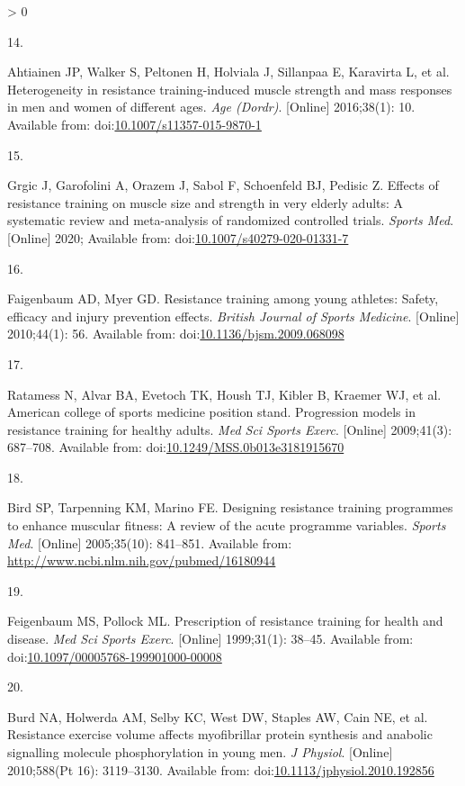 \documentclass[twoside,10pt]{gihclass} %
\newlength{\cslhangindent}
\newlength{\csllabelwidth}
\newenvironment{CSLReferences}[3] %
 {%
  \setlength{\parindent}{0pt}
  \ifodd #1 \everypar{\setlength{\hangindent}{\cslhangindent}}\ignorespaces\fi
  \ifnum #2 > 0
  \setlength{\parskip}{#2\baselineskip}
  \fi
 }%
 {}
\newcommand{\CSLLeftMargin}[1]{\parbox[t]{\maxof{\widthof{#1}}{\csllabelwidth}}{#1}}
\newcommand{\CSLRightInline}[1]{\parbox[t]{\linewidth}{#1}}
\begin{document}
\begin{CSLReferences}{0}{0}
\leavevmode\hypertarget{ref-RN1741}{}%
\CSLLeftMargin{14. }
\CSLRightInline{Ahtiainen JP, Walker S, Peltonen H, Holviala J, Sillanpaa E, Karavirta L, et al. Heterogeneity in resistance training-induced muscle strength and mass responses in men and women of different ages. \emph{Age (Dordr)}. {[}Online{]} 2016;38(1): 10. Available from: doi:\href{https://doi.org/10.1007/s11357-015-9870-1}{10.1007/s11357-015-9870-1}}

\leavevmode\hypertarget{ref-RN2534}{}%
\CSLLeftMargin{15. }
\CSLRightInline{Grgic J, Garofolini A, Orazem J, Sabol F, Schoenfeld BJ, Pedisic Z. Effects of resistance training on muscle size and strength in very elderly adults: A systematic review and meta-analysis of randomized controlled trials. \emph{Sports Med}. {[}Online{]} 2020; Available from: doi:\href{https://doi.org/10.1007/s40279-020-01331-7}{10.1007/s40279-020-01331-7}}

\leavevmode\hypertarget{ref-RN2536}{}%
\CSLLeftMargin{16. }
\CSLRightInline{Faigenbaum AD, Myer GD. Resistance training among young athletes: Safety, efficacy and injury prevention effects. \emph{British Journal of Sports Medicine}. {[}Online{]} 2010;44(1): 56. Available from: doi:\href{https://doi.org/10.1136/bjsm.2009.068098}{10.1136/bjsm.2009.068098}}

\leavevmode\hypertarget{ref-RN1}{}%
\CSLLeftMargin{17. }
\CSLRightInline{Ratamess N, Alvar BA, Evetoch TK, Housh TJ, Kibler B, Kraemer WJ, et al. American college of sports medicine position stand. Progression models in resistance training for healthy adults. \emph{Med Sci Sports Exerc}. {[}Online{]} 2009;41(3): 687--708. Available from: doi:\href{https://doi.org/10.1249/MSS.0b013e3181915670}{10.1249/MSS.0b013e3181915670}}

\leavevmode\hypertarget{ref-RN798}{}%
\CSLLeftMargin{18. }
\CSLRightInline{Bird SP, Tarpenning KM, Marino FE. Designing resistance training programmes to enhance muscular fitness: A review of the acute programme variables. \emph{Sports Med}. {[}Online{]} 2005;35(10): 841--851. Available from: \url{http://www.ncbi.nlm.nih.gov/pubmed/16180944}}

\leavevmode\hypertarget{ref-RN2538}{}%
\CSLLeftMargin{19. }
\CSLRightInline{Feigenbaum MS, Pollock ML. Prescription of resistance training for health and disease. \emph{Med Sci Sports Exerc}. {[}Online{]} 1999;31(1): 38--45. Available from: doi:\href{https://doi.org/10.1097/00005768-199901000-00008}{10.1097/00005768-199901000-00008}}

\leavevmode\hypertarget{ref-RN791}{}%
\CSLLeftMargin{20. }
\CSLRightInline{Burd NA, Holwerda AM, Selby KC, West DW, Staples AW, Cain NE, et al. Resistance exercise volume affects myofibrillar protein synthesis and anabolic signalling molecule phosphorylation in young men. \emph{J Physiol}. {[}Online{]} 2010;588(Pt 16): 3119--3130. Available from: doi:\href{https://doi.org/10.1113/jphysiol.2010.192856}{10.1113/jphysiol.2010.192856}}


\end{CSLReferences}
\end{document}
